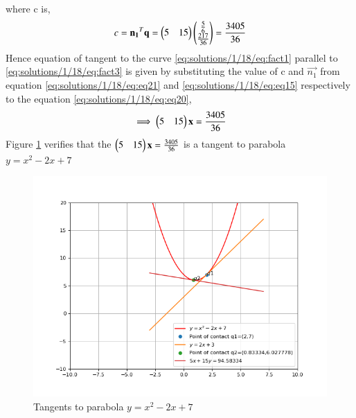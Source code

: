 \begin{enumerate}
\begin{align}
	\end{align}
	where c is,
	\begin{align}
		c = \mathbf{n_1}^T\mathbf{q} = \begin{pmatrix}5&15\end{pmatrix}\begin{pmatrix}\frac{5}{6}\\\frac{217}{36}\end{pmatrix} = \frac{3405}{36} 
		\label{eq:solutions/1/18/eq:eq21}
	\end{align}
	Hence equation of tangent to the curve \eqref{eq:solutions/1/18/eq:fact1} parallel to \eqref{eq:solutions/1/18/eq:fact3} is given by substituting the value of c and $\vec{n_1}$ from equation \eqref{eq:solutions/1/18/eq:eq21} and \eqref{eq:solutions/1/18/eq:eq15} respectively to the equation \eqref{eq:solutions/1/18/eq:eq20},
	\begin{align}
		\implies\begin{pmatrix}5&15\end{pmatrix}\mathbf{x} = \frac{3405}{36} 
	\end{align}
	Figure \ref{eq:solutions/1/18/eq:fig1} verifies that the $\begin{pmatrix}5&15\end{pmatrix}\mathbf{x} = \frac{3405}{36}$ is a tangent to parabola  $y = x^2-2x+7$
	\begin{figure}
		\centering
		\includegraphics[width=\columnwidth]{./solutions/conics/1/18/codes/parallelPerpendicularLineTangent.png}
		\caption{Tangents to parabola $y = x^2-2x+7$}
		\label{eq:solutions/1/18/eq:fig1}
	\end{figure}

	\end{enumerate}
		
	
